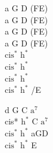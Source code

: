 \begin{chord}
    \small{
    a G D (FE)\\
    a G D (FE)\\
    a G D (FE)\\
    a G D (FE)\\
    $\mathrm{cis^*}$ $\mathrm{h^*}$\\
    $\mathrm{cis^*}$ $\mathrm{h^*}$\\
    $\mathrm{cis^*}$ $\mathrm{h^*}$\\
    $\mathrm{cis^*}$ $\mathrm{h^*}$ /E

    d G C $\mathrm{a^7}$\\
    cis* $\mathrm{h^*}$ C $\mathrm{a^7}$\\
    $\mathrm{cis^*}$ $\mathrm{h^*}$ aGD\\
    $\mathrm{cis^*}$ $\mathrm{h^*}$ E
    }
\end{chord}
